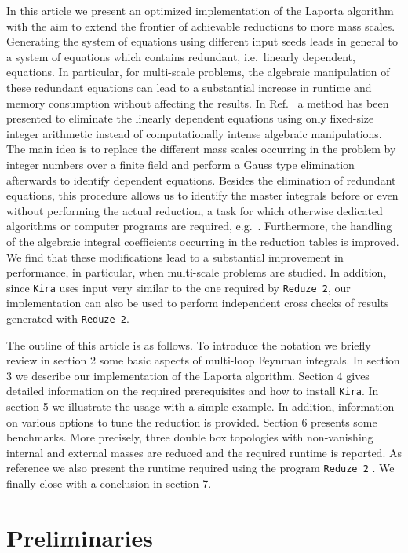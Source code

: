 \documentclass[a4paper,12pt]{scrartcl}
\newcommand*{\kira}{\texttt{Kira}}
\newcommand*{\reduzetwo}{\texttt{Reduze\,2}}
\begin{document}
In this article we present an optimized implementation of the Laporta algorithm
with the aim to extend the frontier of achievable reductions to more mass
scales. Generating the system of equations using different input seeds leads in
general to a system of equations which contains redundant, i.e.\ linearly
dependent, equations.  In particular, for multi-scale problems, the algebraic
manipulation of these redundant equations can lead to a substantial increase in
runtime and memory consumption without affecting the results. In
Ref.~\cite{Kant:2013vta} a method has been presented to eliminate the linearly
dependent equations using only fixed-size integer arithmetic instead of
computationally intense algebraic manipulations. The main idea is to replace the
different mass scales occurring in the problem by integer numbers over a finite
field and perform a Gauss type elimination afterwards to identify dependent
equations. Besides the elimination of redundant equations, this procedure allows
us to identify the master integrals before or even without performing the actual
reduction, a task for which otherwise dedicated algorithms or computer
programs are required, e.g.~\cite{Lee:2013hzt,Georgoudis:2016wff}. Furthermore, the
handling of the algebraic integral coefficients occurring in the reduction
tables is improved. We find that these modifications lead to a substantial
improvement in performance, in particular, when multi-scale problems are
studied. In addition, since \kira{} uses input very similar to the one required
by \reduzetwo{}, our implementation can also be used to perform independent cross
checks of results generated with \reduzetwo{}.

The outline of this article is as follows. To introduce the notation
we briefly review in section 2 some basic aspects of multi-loop
Feynman integrals. In section 3 we describe our implementation of the
Laporta algorithm. Section 4 gives detailed information on the
required prerequisites and how to install \kira{}. In section 5 we
illustrate the usage with a simple example. In addition, information
on various options to tune the reduction is provided.  Section 6
presents some benchmarks. More precisely, three double box topologies
with non-vanishing internal and external masses are reduced and the
required runtime is reported. As reference we also present the runtime
required using the program \reduzetwo{}
\cite{Studerus:2009ye,vonManteuffel:2012np}. We finally close with a
conclusion in section 7.


\section{Preliminaries }
\label{feynman integral}
\end{document}

